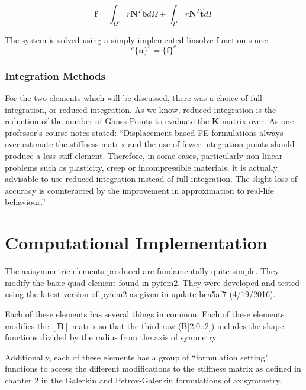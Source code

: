\documentclass[10pt,letterpaper]{report}
\numberwithin{equation}{chapter}
\begin{document}
\begin{equation}
\boldsymbol{f}=\int_{\Omega^e} r \boldsymbol{N}^T \boldsymbol{b} d\Omega +\int_{\Gamma^e} r \boldsymbol{N}^T \boldsymbol{\hat{t}} d\Gamma
\end{equation}

The system is solved using a simply implemented linsolve function since:
\begin{equation}
[\boldsymbol{K}]^e \{\boldsymbol{u}\}^e = \{ \boldsymbol{f}\}^e
\end{equation}

\subsection{Integration Methods}

For the two elements which will be discussed, there was a choice of full integration, or reduced integration.
As we know, reduced integration is the reduction of the number of Gauss Points to evaluate the $\boldsymbol{K}$ matrix over.  As one professor's course notes stated: ``Displacement-based FE formulations always over-estimate the stiffness matrix and the use of fewer integration points should produce a less stiff element. Therefore, in some cases, particularly non-linear problems such as plasticity, creep or incompressible materials, it is actually advisable to use reduced integration instead of full integration. The slight loss of accuracy is counteracted by the improvement in approximation to real-life behaviour.''





\chapter{Computational Implementation}
\label{ch:Computation}

The axisymmetric elements produced are fundamentally quite simple. They modify the basic quad element found in pyfem2. They were developed and tested using the latest version of pyfem2 as given in update \hyperlink{https://github.com/tjfulle/pyfem2/commit/bea5af7b7dc98cb5529406c07bc4a8b18ae5e584}{bea5af7} (4/19/2016).

Each of these elements has several things in common. Each of these elements modifies the $[\pmb{B}]$ matrix so that the third row (B[2,0::2]) includes the shape functions divided by the radius from the axis of symmetry.

Additionally, each of these elements has a group of ``formulation setting" functions to access the different modifications to the stiffness matrix as defined in chapter 2 in the Galerkin and Petrov-Galerkin formulations of axisymmetry. 
\end{document}

